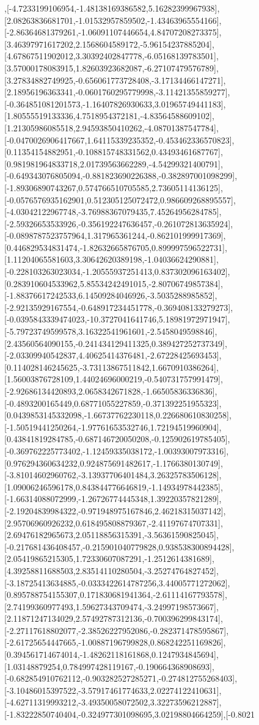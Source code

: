 \documentclass{article}
\begin{document}
,[-4.7233199106954,-1.48138169386582,5.16282399967938],[2.08263836681701,-1.01532957859502,-1.43463965554166],[-2.86364681379261,-1.06091107446654,4.84707208273375],[3.46397971617202,2.1568604589172,-5.96154237885204],[4.67867511902012,3.30392402847778,-6.05168139783501],[3.57000178083915,1.82603923682087,-6.27107479576789],[3.27834882749925,-0.656061773728408,-3.17134466147271],[2.18956196363341,-0.0601760295779998,-3.11421355859277],[-0.364851081201573,-1.16407826930633,3.01965749441183],[1.80555519133336,4.7518954372181,-4.83564588609102],[1.21305986085518,2.94593850410262,-4.08701387547784],[-0.0470026906417667,1.64115339235352,-0.453462336570823],[0.11354154882951,-0.108815748331562,0.43493461687767],[0.981981964833718,2.01739563662289,-4.54299321400791],[-0.649343076805094,-0.881823690226388,-0.382897001098299],[-1.89306890743267,0.574766510705585,2.73605114136125],[-0.0576576935162901,0.512305125072472,0.986609268895557],[-4.03042122967748,-3.76988367079435,7.45264956284785],[-2.59326653533926,-0.356192247636457,-0.261072813635924],[-0.0898787523757964,1.317965361244,-0.862101999917369],[0.446829534831474,-1.82632665876705,0.899997596522731],[1.11204065581603,3.30642620389198,-1.04036624290881],[-0.228103263023034,-1.20555937251413,0.837302096163402],[0.283910604533962,5.85534242491015,-2.80706749857384],[-1.88376617242533,6.14509284046926,-3.5035288985852],[-2.92135929167554,-0.648917234451778,-0.369408133279273],[-0.0395843339474023,-10.3727041641746,5.18981972971947],[-5.79723749599578,3.16322541961601,-2.5458049598846],[2.43560564090155,-0.241434129411325,0.389427252737349],[-2.03309940542837,4.40625414376481,-2.67228425693453],[0.114028146245625,-3.73113867511842,1.6670910386264],[1.56003876728109,1.44024696000219,-0.540731757991479],[-2.92686134420893,2.0658342671828,-1.66505836336836],[-0.4893200165449,0.68771055227859,-0.371392251955323],[0.0439853145332098,-1.66737762230118,0.226680610830258],[-1.50519441250264,-1.97761653532746,1.72194519960904],[0.43841819284785,-0.687146720050208,-0.125902619785405],[-0.369762225773402,-1.12459335038172,-1.00393007973316],[0.976294360634232,0.924875691482617,-1.1766380130749],[-3.81014602960762,-3.13937706401484,3.26325783506128],[1.09006246596178,0.843844776646819,-1.14934978442385],[-1.66314088072999,-1.26726774445348,1.39220357821289],[-2.19204839984322,-0.971948975167846,2.46218315037142],[2.95706960926232,0.618495808879367,-2.41197674707331],[2.69476182965673,2.05118856315391,-3.56361590825045],[-0.217681436408457,-0.215901040779828,0.938538300894428],[2.05419865215305,1.72330607087291,-1.2512614381689],[4.39258811688503,2.83514110280504,-3.25274764827452],[-3.18725413634885,-0.0333422614787256,3.44005771272062],[0.895788754155307,0.171830681941364,-2.61114167793578],[2.74199360977493,1.59627343709474,-3.24997198573667],[2.11871247134029,2.57492787312136,-0.700396299843174],[-2.27117618802077,-2.38526227952086,-0.282371478595867],[-2.61725654447665,-1.00887196799828,0.868242251169826],[0.394561714674014,-1.48262118161868,0.1247934845694],[1.03148879254,0.784997428119167,-0.190664368908693],[-0.682854910762112,-0.903282527285271,-0.274812755268403],[-3.10486015397522,-3.57917461774633,2.02274122410631],[-4.62711319993212,-3.49350058072502,3.32273596212887],[-1.83222850740404,-0.324977301098695,3.02198804664259],[-0.8021
\end{document}

